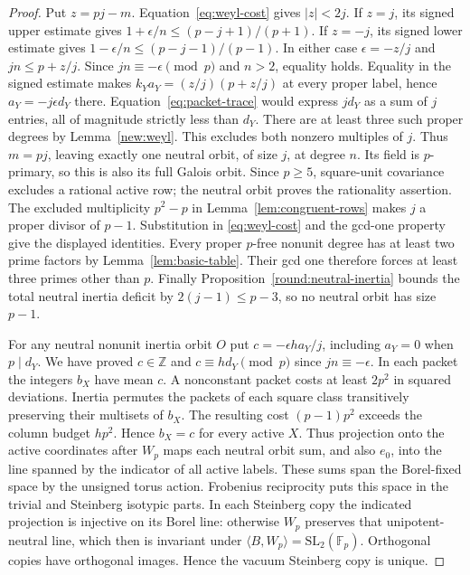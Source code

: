 \documentclass[11pt]{amsart}
\numberwithin{equation}{section}
\theoremstyle{definition}
\theoremstyle{plain}
\newcommand{\ZZ}{\mathbb Z}
\begin{document}
\begin{proof}
Put $z=pj-m$. Equation~\eqref{eq:weyl-cost} gives $|z|<2j$.
If $z=j$, its signed upper estimate gives
$1+\epsilon/n\le (p-j+1)/(p+1)$. If $z=-j$, its signed lower
estimate gives $1-\epsilon/n\le (p-j-1)/(p-1)$.
In either case $\epsilon=-z/j$ and $jn\le p+z/j$.
Since $jn\equiv-\epsilon\pmod p$ and $n>2$, equality holds.
Equality in the signed estimate makes $k_Ya_Y=(z/j)(p+z/j)$
at every proper label, hence $a_Y=-j\epsilon d_Y$ there.
Equation~\eqref{eq:packet-trace} would express $j d_Y$ as a sum
of $j$ entries, all of magnitude strictly less than $d_Y$.
There are at least three such proper degrees by Lemma~\ref{new:weyl}.
This excludes both nonzero multiples of $j$. Thus $m=pj$,
leaving exactly one neutral orbit, of size $j$, at degree $n$.
Its field is $p$-primary, so this is also its full Galois orbit.
Since $p\ge5$, square-unit covariance excludes a rational active row;
the neutral orbit proves the rationality assertion. The excluded
multiplicity $p^2-p$ in Lemma~\ref{lem:congruent-rows} makes $j$ a
proper divisor of $p-1$. Substitution in \eqref{eq:weyl-cost} and
the gcd-one property give the displayed identities. Every proper
$p$-free nonunit degree has at least two prime factors by
Lemma~\ref{lem:basic-table}. Their gcd one therefore forces at least
three primes other than $p$. Finally
Proposition~\ref{round:neutral-inertia} bounds the total neutral
inertia deficit by $2(j-1)\le p-3$, so no neutral orbit has size $p-1$.

For any neutral nonunit inertia orbit $O$ put
$c=-\epsilon h a_Y/j$, including $a_Y=0$ when $p\mid d_Y$.
We have proved $c\in\ZZ$ and $c\equiv h d_Y\pmod p$ since
$jn\equiv-\epsilon$. In each packet the integers $b_X$ have mean $c$.
A nonconstant packet costs at least $2p^2$ in squared deviations.
Inertia permutes the packets of each square class transitively preserving
their multisets of $b_X$. The resulting cost $(p-1)p^2$ exceeds the
column budget $hp^2$. Hence $b_X=c$ for every active $X$.
Thus projection onto the active coordinates after $W_p$ maps each
neutral orbit sum, and also $e_0$, into the line spanned by the
indicator of all active labels. These sums span the Borel-fixed space
by the unsigned torus action. Frobenius reciprocity puts this space
in the trivial and Steinberg isotypic parts. In each Steinberg copy the
indicated projection is injective on its Borel line: otherwise $W_p$
preserves that unipotent-neutral line, which then is invariant under
$\langle B,W_p\rangle=\mathrm{SL}_2(\mathbb F_p)$. Orthogonal
copies have orthogonal images. Hence the vacuum Steinberg copy is unique.
\end{proof}
\end{document}
